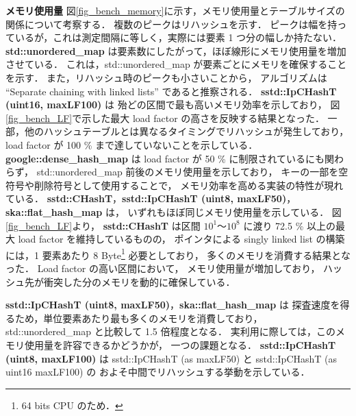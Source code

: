 %
{\bf メモリ使用量}
\samepage\newline\indent
図\ref{fig_bench_memory}に示す，メモリ使用量とテーブルサイズの関係について考察する．
複数のピークはリハッシュを示す．
ピークは幅を持っているが，これは測定間隔に等しく，実際には要素 1 つ分の幅しか持たない．
{\bf std::unordered\_map} は要素数にしたがって，ほぼ線形にメモリ使用量を増加させている．
これは，std::unordered\_map が要素ごとにメモリを確保することを示す．
また，リハッシュ時のピークも小さいことから，
アルゴリズムは ``Separate chaining with linked lists'' であると推察される．
{\bf sstd::IpCHashT (uint16, maxLF100)} は
殆どの区間で最も高いメモリ効率を示しており，
図\ref{fig_bench_LF}で示した最大 load factor の高さを反映する結果となった．
一部，他のハッシュテーブルとは異なるタイミングでリハッシュが発生しており，
load factor が 100 \% まで達していないことを示している．
{\bf google::dense\_hash\_map} は
load factor が 50 \% に制限されているにも関わらず，
std::unordered\_map 前後のメモリ使用量を示しており，
キーの一部を空符号や削除符号として使用することで，
メモリ効率を高める実装の特性が現れている．
{\bf sstd::CHashT}，{\bf sstd::IpCHashT (uint8, maxLF50)}，{\bf ska::flat\_hash\_map} は，
いずれもほぼ同じメモリ使用量を示している．
図\ref{fig_bench_LF}より，
{\bf sstd::CHashT} は区間 $10^1〜10^8$ に渡り 72.5 \% 以上の最大 load factor を維持しているものの，
ポインタによる singly linked list の構築には，1 要素あたり 8 Byte\footnote{64 bits CPU のため．} 必要としており，
多くのメモリを消費する結果となった．
Load factor の高い区間において，
メモリ使用量が増加しており，
ハッシュ先が衝突した分のメモリを動的に確保している．

\noindent
{\bf sstd::IpCHashT (uint8, maxLF50)}，{\bf ska::flat\_hash\_map} は
探査速度を得るため，単位要素あたり最も多くのメモリを消費しており，
std::unordered\_map と比較して 1.5 倍程度となる．
実利用に際しては，このメモリ使用量を許容できるかどうかが，
一つの課題となる．
{\bf sstd::IpCHashT (uint8, maxLF100)} は
sstd::IpCHashT (as maxLF50) と sstd::IpCHashT (as uint16 maxLF100) の
およそ中間でリハッシュする挙動を示している．

